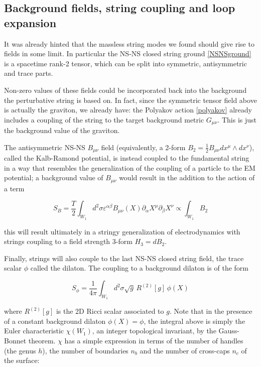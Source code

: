 \subsection{Background fields, string coupling and loop expansion}

It was already hinted that the massless string modes we found should give rise to fields in some limit. In particular the NS-NS closed string ground \eqref{NSNSground} is a spacetime rank-2 tensor, which can be split into symmetric, antisymmetric and trace parts.

Non-zero values of these fields could be incorporated back into the background the perturbative string is based on. In fact, since the symmetric tensor field above is actually the graviton, we already have: the Polyakov action \eqref{polyakov} already includes a coupling of the string to the target background metric $G_{\mu\nu}$. This is just the background value of the graviton.

The antisymmetric NS-NS $B_{\mu\nu}$ field (equivalently, a 2-form $B_2 = \frac{1}{2} B_{\mu\nu} dx^\mu \wedge dx^\nu$), called the Kalb-Ramond potential, is instead coupled to the fundamental string in a way that resembles the generalization of the coupling of a particle to the EM potential; a background value of $B_{\mu\nu}$ would result in the addition to the action of a term

\begin{equation}
	S_B = \frac{T}{2} \int_{W_1} d^2 \sigma \varepsilon^{\alpha\beta} B_{\mu\nu}(X) \partial_\alpha X^\mu \partial_\beta X^\nu \propto \int_{W_1} B_2
	\label{}
\end{equation}

this will result ultimately in a stringy generalization of electrodynamics with strings coupling to a field strength 3-form $H_3 = dB_2$.

Finally, strings will also couple to the last NS-NS closed string field, the trace scalar $\phi$ called the dilaton. The coupling to a background dilaton is of the form

\begin{equation}
	S_\phi = \frac{1}{4\pi} \int_{W_1} d^2 \sigma \sqrt g \, R^{(2)}[g] \, \phi(X)
	\label{}
\end{equation}

where $R^{(2)}[g]$ is the 2D Ricci scalar associated to $g$. Note that in the presence of a constant background dilaton $\phi(X) = \phi$, the integral above is simply the Euler characteristic $\chi(W_1)$, an integer topological invariant, by the Gauss-Bonnet theorem. $\chi$ has a simple expression in terms of the number of handles (the genus $h$), the number of boundaries $n_b$ and the number of cross-caps $n_c$ of the surface:


